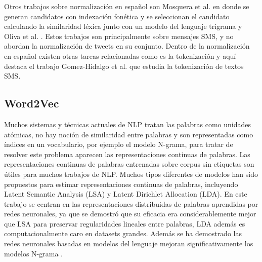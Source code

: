 \documentclass[spanish,12pt, a4paper,twoside]{paper}
\begin{document}
Otros trabajos sobre normalización en español son Mosquera et al. \cite{mosquera:2012} en donde se generan candidatos con indexación fonética y se seleccionan el candidato calculando la similaridad léxica junto con un modelo del lenguaje trigrama y Oliva et al. \cite{oliva:2011}. Estos trabajos son principalmente sobre mensajes SMS, y no abordan la normalización de tweets en su conjunto. Dentro de la normalización en español existen otras tareas relacionadas como es la tokenización y aquí destaca el trabajo Gomez-Hidalgo et al. \cite{gomezhidalgo:2013} que estudia la tokenización de textos SMS.

\subsection{Word2Vec}\label{sec:word2vec}
Muchos sistemas y técnicas actuales de NLP tratan las palabras como unidades atómicas, no hay noción de similaridad entre palabras y son representadas como índices en un vocabulario, por ejemplo el modelo N-grama, para tratar de resolver este problema aparecen las representaciones continuas de palabras. Las representaciones continuas de palabras entrenadas sobre corpus sin etiquetas son útiles para muchos trabajos de NLP. Muchos tipos diferentes de modelos han sido propuestos para estimar representaciones continuas de palabras, incluyendo Latent Semantic Analysis (LSA) y Latent Dirichlet Allocation (LDA). En este trabajo se centran en las representaciones distribuidas de palabras aprendidas por redes neuronales, ya que se demostró que su eficacia era considerablemente mejor que LSA para preservar regularidades lineales entre palabras, LDA además es computacionalmente caro en datasets grandes. Además se ha demostrado las redes neuronales basadas en modelos del lenguaje mejoran significativamente los modelos N-grama \cite{bengio:2003} \cite{mikolov:2011} \cite{schwenk:2007}.\\
\end{document}
